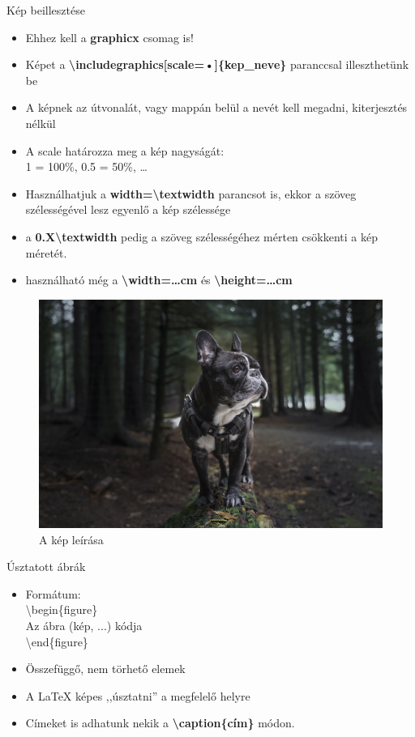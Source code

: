 \documentclass[11pt]{beamer}
\newcommand{\tbs}{\textbackslash}
\begin{document}
\begin{frame}{Kép beillesztése}
\begin{itemize}
\item Ehhez kell a \textbf{graphicx} csomag is!
\item Képet a \textbf{\tbs includegraphics[scale=•]\{kep\_neve\}} paranccsal illeszthetünk be
\item A képnek az útvonalát, vagy mappán belül a nevét kell megadni, kiterjesztés nélkül
\item A scale határozza meg a kép nagyságát: \\ 1 = 100\%, 0.5 = 50\%, \dots
\item Használhatjuk a \textbf{width=\tbs textwidth} parancsot is, ekkor a szöveg szélességével lesz egyenlő a kép szélessége
\item a \textbf{0.X\tbs textwidth} pedig a szöveg szélességéhez mérten csökkenti a kép méretét.
\item használható még a \textbf{\tbs width=\dots cm} és \textbf{\tbs height=\dots cm}
\end{itemize}
\end{frame}

\begin{frame}
\begin{figure}
\includegraphics[scale=0.15]{kep}
\caption{A kép leírása}
\end{figure}
\end{frame} 

\begin{frame}{Úsztatott ábrák}
\begin{itemize}
\item Formátum: \\ 
	\tbs begin\{figure\} \\ 
	Az ábra (kép, ...) kódja \\
	\tbs end\{figure\}
\end{itemize}
\vspace{1cm}
\begin{itemize}
\item Összefüggő, nem törhető elemek
\item A \LaTeX{} képes ,,úsztatni'' a megfelelő helyre
\item Címeket is adhatunk nekik a \textbf{\tbs caption\{cím\}} módon.
\end{itemize}
\end{frame}
\end{document}
